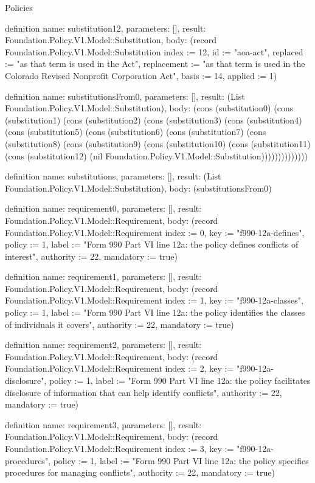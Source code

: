 \begin{lexlean}{Policies}
\begin{semanticmodule}
definition{
  name: substitution12,
  parameters: [],
  result: Foundation.Policy.V1.Model::Substitution,
  body: (record Foundation.Policy.V1.Model::Substitution {index := 12, id := "aoa-act", replaced := "as that term is used in the Act", replacement := "as that term is used in the Colorado Revised Nonprofit Corporation Act", basis := 14, applied := 1})
}

definition{
  name: substitutionsFrom0,
  parameters: [],
  result: (List Foundation.Policy.V1.Model::Substitution),
  body: (cons (substitution0) (cons (substitution1) (cons (substitution2) (cons (substitution3) (cons (substitution4) (cons (substitution5) (cons (substitution6) (cons (substitution7) (cons (substitution8) (cons (substitution9) (cons (substitution10) (cons (substitution11) (cons (substitution12) (nil Foundation.Policy.V1.Model::Substitution))))))))))))))
}

definition{
  name: substitutions,
  parameters: [],
  result: (List Foundation.Policy.V1.Model::Substitution),
  body: (substitutionsFrom0)
}

definition{
  name: requirement0,
  parameters: [],
  result: Foundation.Policy.V1.Model::Requirement,
  body: (record Foundation.Policy.V1.Model::Requirement {index := 0, key := "f990-12a-defines", policy := 1, label := "Form 990 Part VI line 12a: the policy defines conflicts of interest", authority := 22, mandatory := true})
}

definition{
  name: requirement1,
  parameters: [],
  result: Foundation.Policy.V1.Model::Requirement,
  body: (record Foundation.Policy.V1.Model::Requirement {index := 1, key := "f990-12a-classes", policy := 1, label := "Form 990 Part VI line 12a: the policy identifies the classes of individuals it covers", authority := 22, mandatory := true})
}

definition{
  name: requirement2,
  parameters: [],
  result: Foundation.Policy.V1.Model::Requirement,
  body: (record Foundation.Policy.V1.Model::Requirement {index := 2, key := "f990-12a-disclosure", policy := 1, label := "Form 990 Part VI line 12a: the policy facilitates disclosure of information that can help identify conflicts", authority := 22, mandatory := true})
}

definition{
  name: requirement3,
  parameters: [],
  result: Foundation.Policy.V1.Model::Requirement,
  body: (record Foundation.Policy.V1.Model::Requirement {index := 3, key := "f990-12a-procedures", policy := 1, label := "Form 990 Part VI line 12a: the policy specifies procedures for managing conflicts", authority := 22, mandatory := true})
}


\end{semanticmodule}
\end{lexlean}
